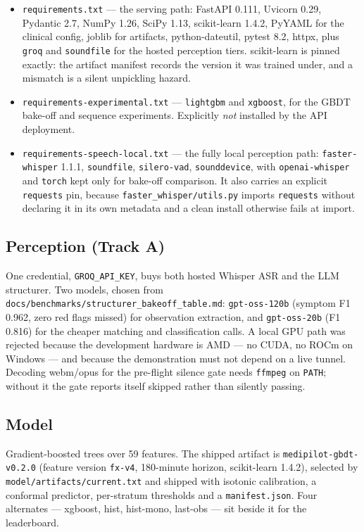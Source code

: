 \documentclass[10pt,a4paper,twocolumn]{article}
\newcommand{\pth}[1]{\textcolor{SecPurple}{\texttt{#1}}}
\newcommand{\cm}[1]{\texttt{#1}}
\begin{document}
\begin{itemize}
  \item \pth{requirements.txt} --- the serving path: FastAPI 0.111, Uvicorn 0.29, Pydantic 2.7,
        NumPy 1.26, SciPy 1.13, scikit-learn 1.4.2, PyYAML for the clinical config, joblib for
        artifacts, python-dateutil, pytest 8.2, httpx, plus \cm{groq} and \cm{soundfile} for the
        hosted perception tiers. scikit-learn is pinned exactly: the artifact manifest records the
        version it was trained under, and a mismatch is a silent unpickling hazard.
  \item \pth{requirements-experimental.txt} --- \cm{lightgbm} and \cm{xgboost}, for the GBDT
        bake-off and sequence experiments. Explicitly \emph{not} installed by the API deployment.
  \item \pth{requirements-speech-local.txt} --- the fully local perception path:
        \cm{faster-whisper} 1.1.1, \cm{soundfile}, \cm{silero-vad}, \cm{sounddevice}, with
        \cm{openai-whisper} and \cm{torch} kept only for bake-off comparison. It also carries an
        explicit \cm{requests} pin, because \cm{faster\_whisper/utils.py} imports \cm{requests}
        without declaring it in its own metadata and a clean install otherwise fails at import.
\end{itemize}

\subsection{Perception (Track A)}
One credential, \cm{GROQ\_API\_KEY}, buys both hosted Whisper ASR and the LLM structurer. Two
models, chosen from \pth{docs/benchmarks/structurer\_bakeoff\_table.md}: \cm{gpt-oss-120b} (symptom
F1 0.962, zero red flags missed) for observation extraction, and \cm{gpt-oss-20b} (F1 0.816) for
the cheaper matching and classification calls. A local GPU path was rejected because the
development hardware is AMD --- no CUDA, no ROCm on Windows --- and because the demonstration must
not depend on a live tunnel. Decoding webm/opus for the pre-flight silence gate needs \cm{ffmpeg}
on \cm{PATH}; without it the gate reports itself skipped rather than silently passing.

\subsection{Model}
Gradient-boosted trees over 59 features. The shipped artifact is \cm{medipilot-gbdt-v0.2.0}
(feature version \cm{fx-v4}, 180-minute horizon, scikit-learn 1.4.2), selected by
\pth{model/artifacts/current.txt} and shipped with isotonic calibration, a conformal predictor,
per-stratum thresholds and a \cm{manifest.json}. Four alternates --- xgboost, hist, hist-mono,
last-obs --- sit beside it for the leaderboard.
\end{document}
